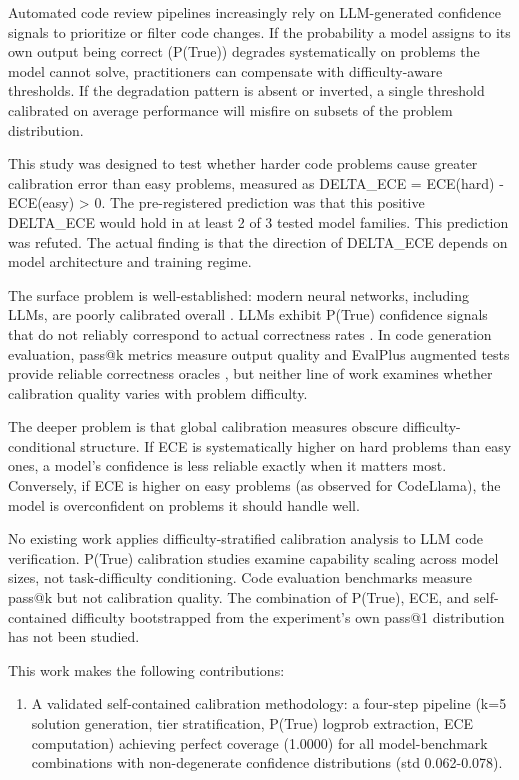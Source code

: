 
Automated code review pipelines increasingly rely on LLM-generated confidence signals to prioritize or filter code changes. If the probability a model assigns to its own output being correct (P(True)) degrades systematically on problems the model cannot solve, practitioners can compensate with difficulty-aware thresholds. If the degradation pattern is absent or inverted, a single threshold calibrated on average performance will misfire on subsets of the problem distribution.

This study was designed to test whether harder code problems cause greater calibration error than easy problems, measured as DELTA\_ECE = ECE(hard) - ECE(easy) > 0. The pre-registered prediction was that this positive DELTA\_ECE would hold in at least 2 of 3 tested model families. This prediction was refuted. The actual finding is that the direction of DELTA\_ECE depends on model architecture and training regime.

The surface problem is well-established: modern neural networks, including LLMs, are poorly calibrated overall \citep{Guo2017Calibration}. LLMs exhibit P(True) confidence signals that do not reliably correspond to actual correctness rates \citep{Kadavath2022Language}. In code generation evaluation, pass@k metrics measure output quality \citep{Chen2021HumanEval} and EvalPlus augmented tests provide reliable correctness oracles \citep{Liu2023EvalPlus}, but neither line of work examines whether calibration quality varies with problem difficulty.

The deeper problem is that global calibration measures obscure difficulty-conditional structure. If ECE is systematically higher on hard problems than easy ones, a model's confidence is less reliable exactly when it matters most. Conversely, if ECE is higher on easy problems (as observed for CodeLlama), the model is overconfident on problems it should handle well.

No existing work applies difficulty-stratified calibration analysis to LLM code verification. P(True) calibration studies examine capability scaling across model sizes, not task-difficulty conditioning. Code evaluation benchmarks measure pass@k but not calibration quality. The combination of P(True), ECE, and self-contained difficulty bootstrapped from the experiment's own pass@1 distribution has not been studied.

This work makes the following contributions:

\begin{enumerate}
\item A validated self-contained calibration methodology: a four-step pipeline (k=5 solution generation, tier stratification, P(True) logprob extraction, ECE computation) achieving perfect coverage (1.0000) for all model-benchmark combinations with non-degenerate confidence distributions (std 0.062-0.078).
\end{enumerate}

